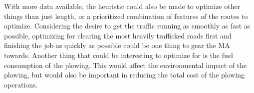 With more data available, the heuristic could also be made to optimize other things than just length, or a prioritized combination of features of the routes to optimize. Considering the desire to get the traffic running as smoothly as fast as possible, optimizing for clearing the most heavily trafficked roads first and finishing the job as quickly as possible could be one thing to gear the MA towards. Another thing that could be interesting to optimize for is the fuel consumption of the plowing. This would affect the environmental impact of the plowing, but would also be important in reducing the total cost of the plowing operations.




\cleardoublepage
